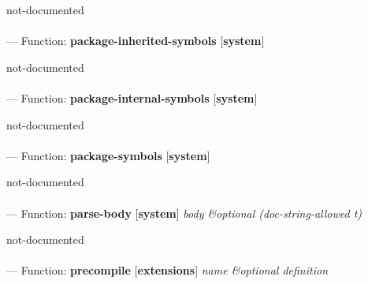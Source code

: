 \begin{adjustwidth}{5em}{5em}
not-documented
\end{adjustwidth}

\paragraph{}
\label{SYSTEM:PACKAGE-INHERITED-SYMBOLS}
--- Function: \textbf{package-inherited-symbols} [\textbf{system}] \textit{}

\begin{adjustwidth}{5em}{5em}
not-documented
\end{adjustwidth}

\paragraph{}
\label{SYSTEM:PACKAGE-INTERNAL-SYMBOLS}
--- Function: \textbf{package-internal-symbols} [\textbf{system}] \textit{}

\begin{adjustwidth}{5em}{5em}
not-documented
\end{adjustwidth}

\paragraph{}
\label{SYSTEM:PACKAGE-SYMBOLS}
--- Function: \textbf{package-symbols} [\textbf{system}] \textit{}

\begin{adjustwidth}{5em}{5em}
not-documented
\end{adjustwidth}

\paragraph{}
\label{SYSTEM:PARSE-BODY}
--- Function: \textbf{parse-body} [\textbf{system}] \textit{body \&optional (doc-string-allowed t)}

\begin{adjustwidth}{5em}{5em}
not-documented
\end{adjustwidth}

\paragraph{}
\label{EXTENSIONS:PRECOMPILE}
--- Function: \textbf{precompile} [\textbf{extensions}] \textit{name \&optional definition}

